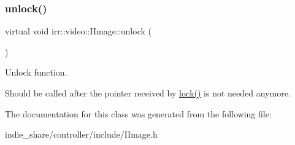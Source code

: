 \subsubsection{\texorpdfstring{unlock()}{unlock()}\hspace{0.1cm}{\footnotesize\ttfamily [2/2]}}
{\footnotesize\ttfamily virtual void irr\+::video\+::\+I\+Image\+::unlock (\begin{DoxyParamCaption}{ }\end{DoxyParamCaption})\hspace{0.3cm}{\ttfamily [pure virtual]}}



Unlock function. 

Should be called after the pointer received by \hyperlink{classirr_1_1video_1_1IImage_a5c4b0b5fa2a5f253f93c1b038e20d204}{lock()} is not needed anymore. 

The documentation for this class was generated from the following file\+:\begin{DoxyCompactItemize}
\item 
indie\+\_\+share/controller/include/I\+Image.\+h\end{DoxyCompactItemize}
